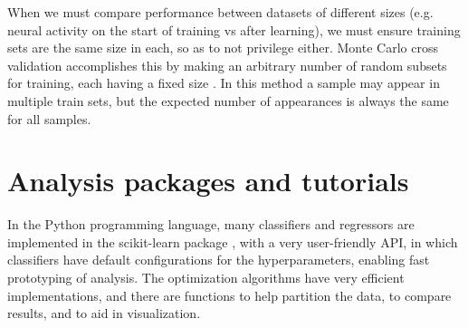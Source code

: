     When we must compare performance between datasets of different sizes (e.g. neural activity on the start of training vs after learning), we must ensure training sets are the same size in each, so as to not privilege either. Monte Carlo cross validation accomplishes this by making an arbitrary number of random subsets for training, each having a fixed size \cite{xu2001monte}. In this method a sample may appear in multiple train sets, but the expected number of appearances is always the same for all samples.

\section*{Analysis packages and tutorials}
    In the Python programming language, many classifiers and regressors are implemented in the scikit-learn package \cite{scikit-learn}, with a very user-friendly API, in which classifiers have default configurations for the hyperparameters, enabling fast prototyping of analysis.
    The optimization algorithms have very efficient implementations, and there are functions to help partition the data, to compare results, and to aid in visualization. 